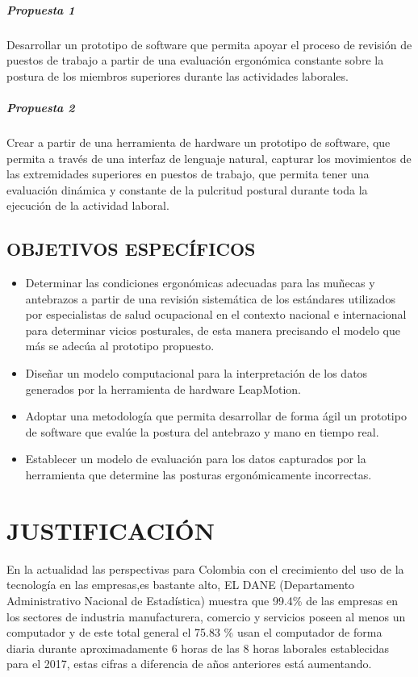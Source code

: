 \paragraph{Propuesta 1}
Desarrollar un prototipo de software que permita apoyar el proceso de revisión de puestos de trabajo a partir de una evaluación ergonómica constante sobre la postura de los miembros superiores durante las actividades laborales.
\paragraph{Propuesta 2}
Crear a partir de una herramienta de hardware un prototipo de software, que permita a través de una interfaz de lenguaje natural, capturar los movimientos de las extremidades superiores en puestos de trabajo, que permita tener una evaluación dinámica y  constante de la pulcritud postural durante toda la ejecución de la actividad laboral. 
\section{OBJETIVOS ESPECÍFICOS}
\begin{itemize}
    \item Determinar las condiciones ergonómicas adecuadas para las muñecas y antebrazos a partir de una revisión sistemática de los estándares utilizados por especialistas de salud ocupacional en el contexto nacional e internacional para determinar vicios posturales,  de esta manera precisando el modelo que más se adecúa al prototipo propuesto.
    \item Diseñar un modelo computacional para la interpretación de los datos generados por la herramienta de hardware LeapMotion.
    \item Adoptar una metodología que permita desarrollar de forma ágil un prototipo de software que evalúe la postura del antebrazo y mano en tiempo real. 
    \item Establecer un modelo de evaluación para los datos capturados por la herramienta que determine las posturas ergonómicamente incorrectas. 
\end{itemize}


\chapter{JUSTIFICACIÓN}
En la actualidad las perspectivas para Colombia con el crecimiento del uso de la tecnología en las empresas,es bastante alto, EL DANE (Departamento Administrativo Nacional de Estadística)  muestra que 99.4\% de las empresas en los sectores de industria manufacturera, comercio y servicios poseen al menos un computador y de este  total general el  75.83 \% usan el computador de forma diaria durante aproximadamente 6 horas de las 8 horas laborales establecidas para el 2017, estas cifras a diferencia de años anteriores está aumentando.


